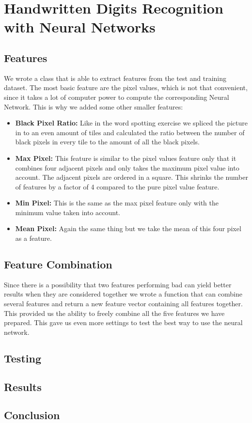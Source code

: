 \documentclass[a4paper, 10pt]{article}
\begin{document}
	\section{Handwritten Digits Recognition with Neural Networks}
	
	\subsection{Features}
	
	\par{We wrote a class that is able to extract features from the test and training dataset. The most basic feature are the pixel values, which is not that convenient, since it takes a lot of computer power to compute the corresponding Neural Network. This is why we added some other smaller features: }
	
	\begin{itemize}
		\item \textbf{Black Pixel Ratio:} Like in the word spotting exercise we spliced the picture in to an even amount of tiles and calculated the ratio between the number of black pixels in every tile to the amount of all the black pixels.
		\item \textbf{Max Pixel:} This feature is similar to the pixel values feature only that it combines four adjacent pixels and only takes the maximum pixel value into account. The adjacent pixels are ordered in a square. This shrinks the number of features by a factor of 4 compared to the pure pixel value feature.
		\item \textbf{Min Pixel:} This is the same as the max pixel feature only with the minimum value taken into account.
		\item \textbf{Mean Pixel:} Again the same thing but we take the mean of this four pixel as a feature.
	\end{itemize}
	
	\subsection{Feature Combination}
	
	\par{Since there is a possibility that two features performing bad can yield better results when they are considered together we wrote a function that can combine several features and return a new feature vector containing all features together. This provided us the ability to freely combine all the five features we have prepared. This gave us even more settings to test the best way to use the neural network.}
	
	\subsection{Testing}
	
	\subsection{Results}

	\subsection{Conclusion}
\end{document}
